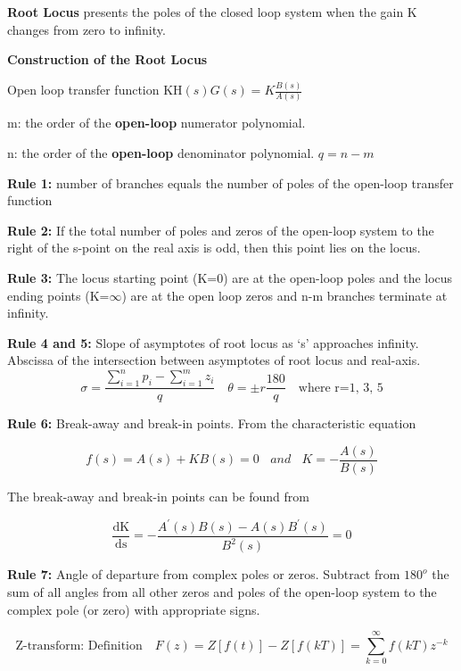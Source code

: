 \begin{multicols}{2}
\textbf{Root Locus} presents the poles of the closed loop system when the gain K changes from zero to infinity.

\textbf{Construction of the Root Locus}

Open loop transfer function
$ \displaystyle \text{KH}\left( s \right)G\left( s \right) = K\frac{B(s)}{A(s)}$

m: the order of the \textbf{open-loop} numerator polynomial.

n: the order of the \textbf{open-loop} denominator polynomial. $q=n-m$

\textbf{Rule 1:} number of branches equals the number of poles of the
 open-loop transfer function

\textbf{Rule 2:} If the total number of poles and zeros of the open-loop
 system to the right of the s-point on the real axis is odd, then this
 point lies on the locus.

\textbf{Rule 3:} The locus starting point (K=0) are at the open-loop
poles and the locus ending points (K=$\infty$) are at the open loop zeros and
n-m branches terminate at infinity.

\textbf{Rule 4 and 5:} Slope of asymptotes of root locus as `s' approaches infinity. \newline Abscissa of the intersection between asymptotes of root locus and real-axis.
\[\sigma  = {\frac{\sum\limits_{i = 1}^n {{p_i}}  - \sum\limits_{i = 1}^m {{z_i}} }{q}} \quad \theta = \pm r{\frac{180}{q}} \quad \text{where r=1, 3, 5} \]


\textbf{Rule 6:} Break-away and break-in points. From the characteristic
equation

\[f\left( s \right) = A\left( s \right) + KB\left( s \right) = 0\ \ \ \ and\ \ \ \ K = - \frac{A\left( s \right)}{B\left( s \right)}\]

The break-away and break-in points can be found from

\[\frac{\text{dK}}{\text{ds}} = - \frac{A^{'}\left( s \right)B\left( s \right) - A\left( s \right)B^{'}\left( s \right)}{B^{2}\left( s \right)} = 0
\]

\textbf{Rule 7:} Angle of departure from complex poles or zeros.
Subtract from $180^o$ the sum of all angles from all other zeros and poles
of the open-loop system to the complex pole (or zero) with appropriate signs. 

\[ \text{Z-transform: Definition} \quad F(z)=Z[f(t)]-Z[f(kT)]=\sum_{k=0}^{\infty}f(kT)z^{-k}\]
\end{multicols}
